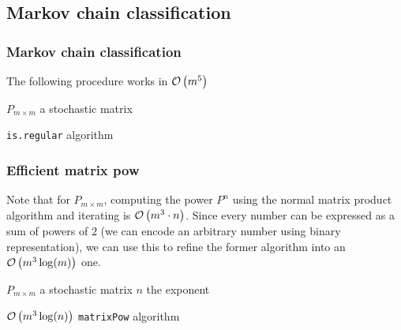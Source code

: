 \subsection{Markov chain classification}
 \begin{frame}\frametitle{Markov chain classification}
    \vspace{3em}
    
    The following procedure works in \(\mathcal{O}\left(m^5\right)\)

    \begin{algorithm}[H]
    \begin{algorithmic}[1]
    \REQUIRE $P_{m \times m}$ a stochastic matrix
    \NEWLINE
    \ELSE
    \ENDIF
    \end{algorithmic}
    \caption{\texttt{is.regular} algorithm}
    \label{alg:isRegular}
    \end{algorithm}
    
\end{frame}

\begin{frame} \frametitle{Efficient matrix pow}
    \vspace{3em}
    
    Note that for \(P_{m\times m}\), computing the power \(P^n\) using the normal matrix product algorithm and
    iterating is \(\mathcal{O}\left(m^3 \cdot n\right)\). Since every number can be expressed as a sum
    of powers of \(2\) (we can encode an arbitrary number using binary representation), we can use this to refine
    the former algorithm into an \(\mathcal{O}\left(m^3 \log(m)\right)\) one.

    \begin{algorithm}[H]
    \begin{algorithmic}[1]
    \REQUIRE $P_{m \times m}$ a stochastic matrix
    \REQUIRE $n$ the exponent
    \NEWLINE
        \ENDIF
    \ENDWHILE
    \end{algorithmic}
    \caption{$\mathcal{O}\left(m^3\log(n)\right)$ \texttt{matrixPow} algorithm}
    \label{alg:matrixPow}
    \end{algorithm}
\end{frame}

